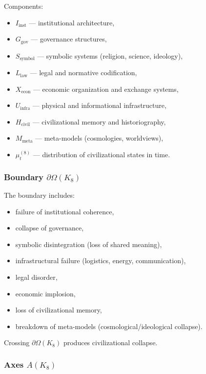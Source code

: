 Components:
\begin{itemize}
    \item $I_{\mathrm{inst}}$ — institutional architecture,
    \item $G_{\mathrm{gov}}$ — governance structures,
    \item $S_{\mathrm{symbol}}$ — symbolic systems (religion, science, ideology),
    \item $L_{\mathrm{law}}$ — legal and normative codification,
    \item $X_{\mathrm{econ}}$ — economic organization and exchange systems,
    \item $U_{\mathrm{infra}}$ — physical and informational infrastructure,
    \item $H_{\mathrm{civil}}$ — civilizational memory and historiography,
    \item $M_{\mathrm{meta}}$ — meta-models (cosmologies, worldviews),
    \item $\mu^{(8)}_t$ — distribution of civilizational states in time.
\end{itemize}

\subsubsection{Boundary \texorpdfstring{$\partial\Omega(K_8)$}{\partial\Omega(K_8)}}

The boundary includes:
\begin{itemize}
    \item failure of institutional coherence,
    \item collapse of governance,
    \item symbolic disintegration (loss of shared meaning),
    \item infrastructural failure (logistics, energy, communication),
    \item legal disorder,
    \item economic implosion,
    \item loss of civilizational memory,
    \item breakdown of meta-models (cosmological/ideological collapse).
\end{itemize}

Crossing $\partial\Omega(K_8)$ produces civilizational collapse.

\subsubsection{Axes \texorpdfstring{$A(K_8)$}{A(K_8)}}


